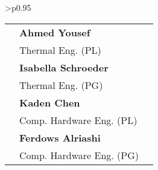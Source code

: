 \begin{center}
\begin{minipage}{\textwidth}
\begin{tabular}{>{\centering\arraybackslash}p{}}
\begin{tabular}{>{\centering\arraybackslash}p{} >{\centering\arraybackslash}p{} >{\centering\arraybackslash}p{}}
& \textbf{Ahmed Yousef} & \\
& \small Thermal Eng. (PL) & \\

& \textbf{Isabella Schroeder} & \\
& \small Thermal Eng. (PG) & \\

& \textbf{Kaden Chen} & \\
& \small Comp. Hardware Eng. (PL) & \\

& \textbf{Ferdows Alriashi} & \\
& \small Comp. Hardware Eng. (PG) & \\

\end{tabular}
\end{tabular}
\end{minipage}
\end{center}

